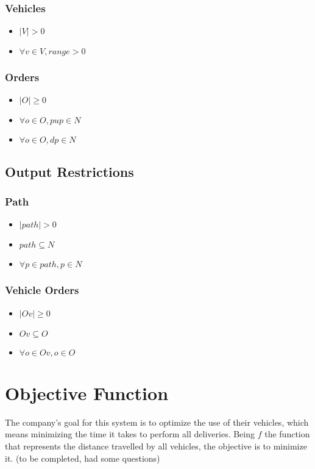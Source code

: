 \subsubsection{Vehicles}
\begin{itemize}
    \item $ |V| > 0 $
    \item $ \forall v \in V, range > 0 $
\end{itemize}

\subsubsection{Orders}
\begin{itemize}
    \item $ |O| \geq 0 $
    \item $ \forall o \in O, pup \in N $
    \item $ \forall o \in O, dp \in N $
\end{itemize}


\subsection{Output Restrictions}

\subsubsection{Path}
\begin{itemize}
    \item $ |path| > 0 $
    \item $ path \subseteq N $
    \item $ \forall p \in path, p \in N $
\end{itemize}

\subsubsection{Vehicle Orders}
\begin{itemize}
    \item $ |Ov| \geq 0 $
    \item $ Ov \subseteq O $
    \item $ \forall o \in Ov, o \in O$
\end{itemize}


\section{Objective Function}

The company's goal for this system is to optimize the use of their vehicles, which means minimizing the time it takes to perform all deliveries. Being $ f $ the function that represents the distance travelled by all vehicles, the objective is to minimize it. (to be completed, had some questions)
